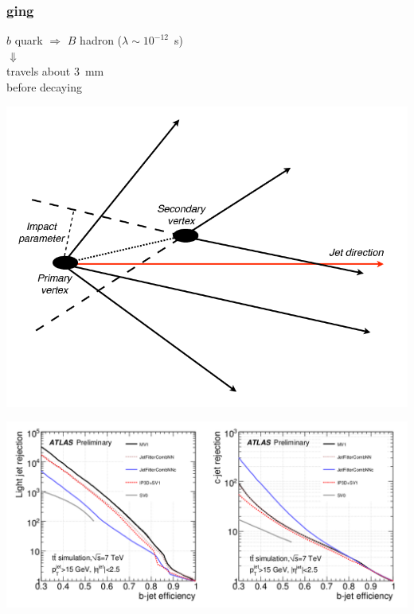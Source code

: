 \begin{frame}\frametitle{\btag ging}
\centering\footnotesize

\begin{minipage}{.3\textwidth}\centering

$b$ quark $\Rightarrow$ $B$ hadron ($\lambda\sim 10^{-12}$~s)\\
{\large$\Downarrow$}\\
travels about 3~mm\\ before decaying

\includegraphics[width=.8\textwidth]{../objectsreconstruction/figures/Picture-b-tagging-2.png}

\end{minipage}\begin{minipage}{.7\textwidth}\centering

\includegraphics[width=1.\textwidth]{../objectsreconstruction/figures/btageffs.png}

\end{minipage}

\myskip

\begin{minipage}{.4\textwidth}\centering



\end{minipage}
\end{frame}
